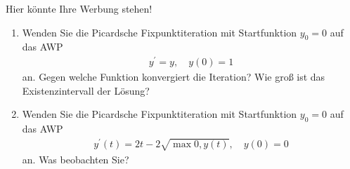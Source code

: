 \begin{exercise}
    Hier könnte Ihre Werbung stehen!
    \begin{enumerate}[label = \alph*)]
        \item Wenden Sie die Picardsche Fixpunktiteration mit Startfunktion $y_0 = 0$ auf das AWP
            \begin{align*}
                y^\prime = y, \quad y(0) = 1
            \end{align*}
            an. Gegen welche Funktion konvergiert die Iteration? Wie groß ist das Existenzintervall der Lösung?

        \item Wenden Sie die Picardsche Fixpunktiteration mit Startfunktion $y_0 = 0$ auf das AWP
        \begin{align*}
            y^\prime(t) = 2t - 2\sqrt{\max{0, y(t)}}, \quad y(0) = 0
        \end{align*}
        an. Was beobachten Sie?
    \end{enumerate}
\end{exercise}

